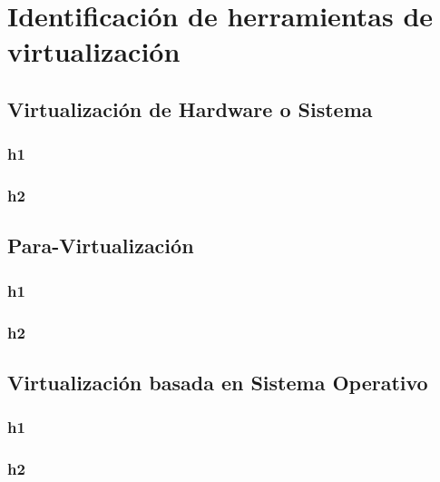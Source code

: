 \section{Identificación de herramientas de virtualización} \label{herramientas}


\subsection{Virtualización de Hardware o Sistema}
\subsubsection{h1}
\subsubsection{h2}

\subsection{Para-Virtualización}
\subsubsection{h1}
\subsubsection{h2}

\subsection{Virtualización basada en Sistema Operativo}
\subsubsection{h1}
\subsubsection{h2}


